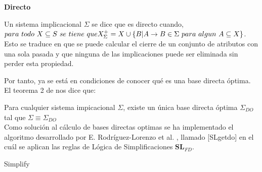 \textbf{Directo}

Un sistema implicacional \( \Sigma \) se dice que es directo cuando, \( para \ todo \ X \subseteq S \ se \ tiene \ que \\ X^+_{\Sigma} =  X \cup \{ B | A \to B \in \Sigma \ para \ algun \ A \subseteq X \} \). Esto se traduce en que se puede calcular el cierre de un conjunto de atributos con una sola pasada y que ninguna de las implicaciones puede ser eliminada sin perder esta propiedad.

Por tanto, ya se est\'a en condiciones de conocer qu\'e es una base directa \'optima.\\

El teorema 2 de \cite{DO2} nos dice que:

Para cualquier sistema impicacional \(\Sigma\), existe un \'unica base directa \'optima \(\Sigma_{DO}\) tal que \(\Sigma \equiv \Sigma_{DO} \)\\

Como soluci\'on al c\'alculo de bases directas optimas se ha implementado el algoritmo desarrollado por  E. Rodr\'iguez-Lorenzo et al. \cite{DO2}, llamado [SLgetdo] en el cu\'al se aplican las reglas de L\'ogica de Simplificaciones \(\textbf{SL}_{FD}\).\\

\IncMargin{1em}
\begin{algorithm}[H]
    \SetAlgoLined
    \DontPrintSemicolon
    \caption{Simplify}\label{alg:4}
\end{algorithm}\DecMargin{1em}

